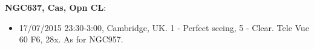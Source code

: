 {\bf NGC637, Cas, Opn CL}:
\begin{itemize}
\item 17/07/2015 23:30-3:00, Cambridge, UK. 1 - Perfect seeing, 5 - Clear. Tele Vue 60 F6, 28x. As for NGC957.
\end{itemize}
